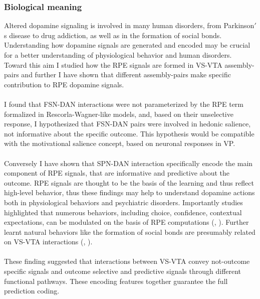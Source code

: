 \subsubsection{Biological meaning}
Altered dopamine signaling is involved in many human disorders, from Parkinson$'$s disease to drug addiction, as well as in the formation of social bonds. Understanding how dopamine signals are generated and encoded may be crucial for a better understanding of physiological behavior and human disorders.\\Toward this aim I studied how the RPE signals are formed in VS-VTA assembly-pairs and further I have shown that different assembly-pairs make specific contribution to RPE dopamine signals.\\\\I found that FSN-DAN interactions were not parameterized by the RPE term formalized in Rescorla-Wagner-like models, and, based on their unselective response, I hypothesized that FSN-DAN pairs were involved in hedonic salience, not informative about the specific outcome. This hypothesis would be compatible with the  motivational salience concept, based on neuronal responses in VP.\\\\Conversely I have shown that SPN-DAN interaction specifically encode the main component of RPE signals, that are informative and predictive about the outcome. RPE signals are thought to be the basis of the learning and thus reflect high-level behavior, thus these findings may help to understand dopamine actions both in physiological behaviors and psychiatric disorders. Importantly studies highlighted that numerous behaviors, including choice, confidence, contextual expectations, can be modulated on the basis of  RPE computations (\cite{Gadagkar}, \cite{Stauffer}). Further learnt natural behaviors like the formation of social bonds are presumably related on VS-VTA interactions (\cite{Ungless2004}, \cite{Walum}).\\\\These finding suggested that interactions between VS-VTA convey not-outcome specific signals and outcome selective and predictive signals through different functional pathways. These encoding features together guarantee the full prediction coding.


